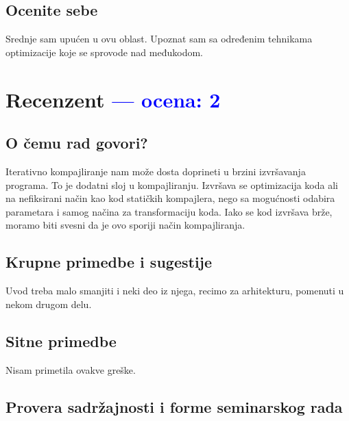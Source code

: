 \documentclass[a4paper]{report}
\newcommand{\odgovor}[1]{\textcolor{blue}{#1}}
\begin{document}
\section{Ocenite sebe}
Srednje sam upućen u ovu oblast. Upoznat sam sa određenim tehnikama optimizacije koje se sprovode nad međukodom.

\chapter{Recenzent \odgovor{--- ocena: 2} }


\section{O čemu rad govori?}
Iterativno kompajliranje nam može dosta doprineti u brzini izvršavanja programa. To je dodatni sloj u kompajliranju. Izvršava se optimizacija koda ali na nefiksirani način kao kod statičkih kompajlera, nego sa mogućnosti odabira parametara i samog načina za transformaciju koda. Iako se kod izvršava brže, moramo biti svesni da je ovo sporiji način kompajliranja.

\section{Krupne primedbe i sugestije}
Uvod treba malo smanjiti i neki deo iz njega, recimo za arhitekturu, pomenuti u nekom drugom delu.

\section{Sitne primedbe}
Nisam primetila ovakve greške.

\section{Provera sadržajnosti i forme seminarskog rada}
\end{document}
